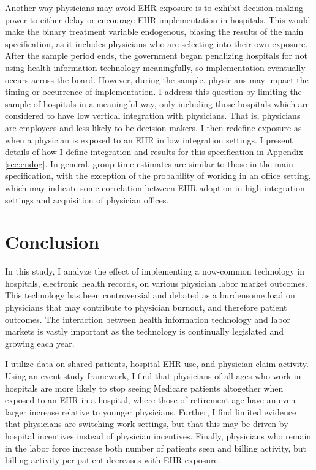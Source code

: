 \documentclass[11pt]{article}
\begin{document}
Another way physicians may avoid EHR exposure is to exhibit decision making power to either delay or encourage EHR implementation in hospitals. This would make the binary treatment variable endogenous, biasing the results of the main specification, as it includes physicians who are selecting into their own exposure. After the sample period ends, the government began penalizing hospitals for not using health information technology meaningfully, so implementation eventually occurs across the board. However, during the sample, physicians may impact the timing or occurrence of implementation. I address this question by limiting the sample of hospitals in a meaningful way, only including those hospitals which are considered to have low vertical integration with physicians. That is, physicians are employees and less likely to be decision makers. I then redefine exposure as when a physician is exposed to an EHR in low integration settings. I present details of how I define integration and results for this specification in Appendix \ref{sec:endog}. In general, group time estimates are similar to those in the main specification, with the exception of the probability of working in an office setting, which may indicate some correlation between EHR adoption in high integration settings and acquisition of physician offices. 


\section{Conclusion}

In this study, I analyze the effect of implementing a now-common technology in hospitals, electronic health records, on various physician labor market outcomes. This technology has been controversial and debated as a burdensome load on physicians that may contribute to physician burnout, and therefore patient outcomes. The interaction between health information technology and labor markets is vastly important as the technology is continually legislated and growing each year.

I utilize data on shared patients, hospital EHR use, and physician claim activity. Using an event study framework, I find that physicians of all ages who work in hospitals are more likely to stop seeing Medicare patients altogether when exposed to an EHR in a hospital, where those of retirement age have an even larger increase relative to younger physicians. Further, I find limited evidence that physicians are switching work settings, but that this may be driven by hospital incentives instead of physician incentives. Finally, physicians who remain in the labor force increase both number of patients seen and billing activity, but billing activity per patient decreases with EHR exposure. 
\end{document}
